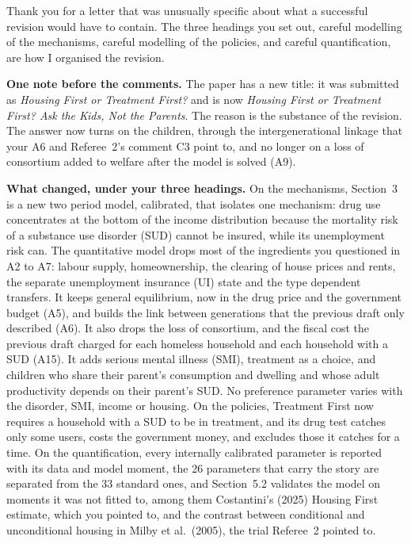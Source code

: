 \documentclass[11pt]{article}
\begin{document}

Thank you for a letter that was unusually specific about what a successful
revision would have to contain. The three headings you set out, careful modelling
of the mechanisms, careful modelling of the policies, and careful quantification,
are how I organised the revision.


{\color{respred}
\textbf{One note before the comments.} The paper has a new title: it was submitted as
\emph{Housing First or Treatment First?} and is now \emph{Housing First or Treatment First? Ask the Kids, Not the Parents}. The reason is the substance of the revision. The answer
now turns on the children, through the intergenerational linkage that your A6 and
Referee~2's comment C3 point to, and no longer on a loss of consortium added to
welfare after the model is solved (A9).

\textbf{What changed, under your three headings.} On the mechanisms, Section~3 is a
new two period model, calibrated, that isolates one mechanism: drug use
concentrates at the bottom of the income distribution because the mortality risk
of a substance use disorder (SUD) cannot be insured, while its unemployment risk
can. The quantitative model drops most of the ingredients you questioned in A2 to
A7: labour supply, homeownership, the clearing of house prices and rents, the
separate unemployment insurance (UI) state and the type dependent transfers. It
keeps general equilibrium, now in the drug price and the government budget (A5),
and builds the link between generations that the previous draft only described
(A6). It also drops the
loss of consortium, and the fiscal cost the previous draft charged for each
homeless household and each household with a SUD (A15). It adds serious mental
illness (SMI), treatment as a choice, and children who share their parent's
consumption and dwelling and whose adult productivity depends on their parent's
SUD. No preference parameter varies with the disorder, SMI, income or housing. On
the policies, Treatment First now requires a household with a SUD to be in
treatment, and its drug test catches only some users, costs the government money,
and excludes those it catches for a time. On the quantification, every internally
calibrated parameter is reported with its data and model moment, the 26 parameters
that carry the story are separated from the 33 standard ones, and Section~5.2
validates the model on moments it was not fitted to, among them Costantini's
(2025) Housing First estimate, which you pointed to, and the contrast between
conditional and unconditional housing in Milby et al.\ (2005), the trial Referee~2
pointed to.

}
\end{document}
